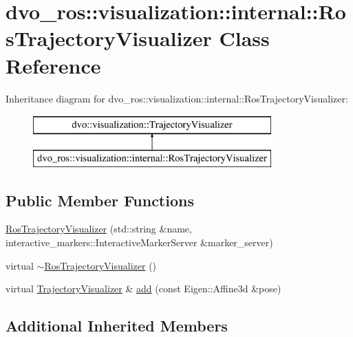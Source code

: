 \hypertarget{classdvo__ros_1_1visualization_1_1internal_1_1_ros_trajectory_visualizer}{}\section{dvo\+\_\+ros\+:\+:visualization\+:\+:internal\+:\+:Ros\+Trajectory\+Visualizer Class Reference}
\label{classdvo__ros_1_1visualization_1_1internal_1_1_ros_trajectory_visualizer}
Inheritance diagram for dvo\+\_\+ros\+:\+:visualization\+:\+:internal\+:\+:Ros\+Trajectory\+Visualizer\+:\begin{figure}[H]
\begin{center}
\leavevmode
\includegraphics[height=2.000000cm]{classdvo__ros_1_1visualization_1_1internal_1_1_ros_trajectory_visualizer}
\end{center}
\end{figure}
\subsection*{Public Member Functions}
\begin{DoxyCompactItemize}
\item 
\mbox{\hyperlink{classdvo__ros_1_1visualization_1_1internal_1_1_ros_trajectory_visualizer_a374a8b54ec453c02ea55aab2c47e02c6}{Ros\+Trajectory\+Visualizer}} (std\+::string \&name, interactive\+\_\+markers\+::\+Interactive\+Marker\+Server \&marker\+\_\+server)
\item 
virtual \mbox{\hyperlink{classdvo__ros_1_1visualization_1_1internal_1_1_ros_trajectory_visualizer_a1dc0830231540aeb564421012b59ae04}{$\sim$\+Ros\+Trajectory\+Visualizer}} ()
\item 
virtual \mbox{\hyperlink{classdvo_1_1visualization_1_1_trajectory_visualizer}{Trajectory\+Visualizer}} \& \mbox{\hyperlink{classdvo__ros_1_1visualization_1_1internal_1_1_ros_trajectory_visualizer_acd66991b88e68e9843028cb5cb65c29a}{add}} (const Eigen\+::\+Affine3d \&pose)
\end{DoxyCompactItemize}
\subsection*{Additional Inherited Members}


